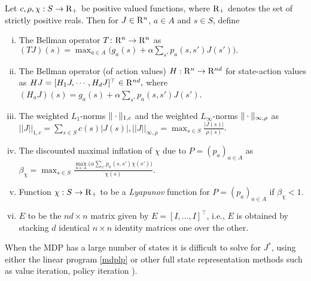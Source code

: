 \begin{definition}
Let $c,\rho,\chi:S \to \mathrm{R}_+$ be positive valued functions, where $\mathrm{R}_+$ denotes the set of strictly positive reals. Then for $J\in \mathrm{R}^n$, $a\in A$ and $s\in S$, 
define
\begin{enumerate}[(i)]
\item The Bellman operator $T\colon \mathrm{R}^n \rightarrow \mathrm{R}^n$ as $(TJ)(s)=\max_{a \in A}\big(g_a(s)+\alpha \sum_{s'} p_a(s,s')J(s')\big).
$
\item \label{bellactval} The Bellman operator (of action values) $H: \mathrm{R}^n \to \mathrm{R}^{nd}$ for state-action values as $HJ=[ H_1 J,\cdots,H_d J]^\top\in \mathrm{R}^{nd},$ where $(H_a J)(s)= g_a(s)+\alpha \sum_{s'}p_a(s,s') J(s')$.
\item The weighted $L_1$-norms $\|\cdot\|_{1,c}$ 
and 
the weighted $L_\infty$-norms  $\|\cdot\|_{\infty,\rho}$ as $
||J||_{1,c}=\sum_{s \in S} c(s)|J(s)|, 
||J||_{\infty,\rho}=\max_{s \in S} \frac{|J(s)|}{\rho(s)}$.
\item The discounted maximal inflation of $\chi$ due to $P = (p_a)_{a\in A}$ as $\beta_{\chi}=\max_{s \in S} \frac{\underset{a \in A}{\max}\big(\alpha\sum_{s'}p_a(s,s')\chi(s')\big)}{\chi(s)}$.
\item Function $\chi:S\to\mathrm{R}_+$ to be a \emph{Lyapunov} function for $P = (p_a)_{a\in A}$ if $\beta_{\chi}<1$.
\item $E$ to be the $nd\times n$ matrix given by $E=[I,\ldots,I]^\top$, i.e., $E$ is obtained by stacking $d$ identical $n\times n$ identity matrices one over the other.
\end{enumerate}
\end{definition}
When the MDP has a large number of states it is difficult to solve for $J^*$, using either the linear program \eqref{mdplp} or other full state representation methods such as value iteration, policy iteration \cite{BertB}).

